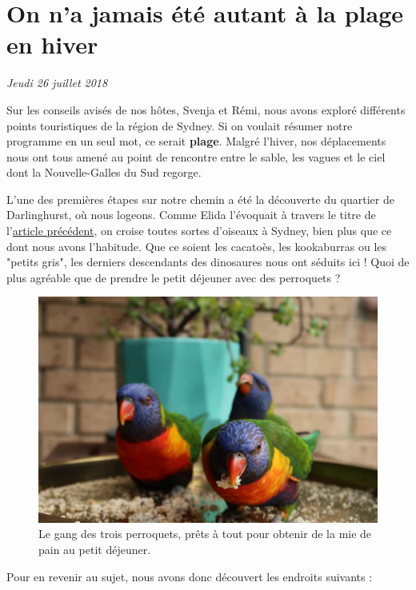 \hypertarget{on-na-jamais-uxe9tuxe9-autant-uxe0-la-plage-en-hiver}{%
\section{On n'a jamais été autant à la plage en
hiver}\label{on-na-jamais-uxe9tuxe9-autant-uxe0-la-plage-en-hiver}}

\emph{Jeudi 26 juillet 2018}

Sur les conseils avisés de nos hôtes, Svenja et Rémi, nous avons exploré
différents points touristiques de la région de Sydney. Si on voulait
résumer notre programme en un seul mot, ce serait \textbf{plage}. Malgré
l'hiver, nos déplacements nous ont tous amené au point de rencontre
entre le sable, les vagues et le ciel dont la Nouvelle-Galles du Sud
regorge.

L'une des premières étapes sur notre chemin a été la découverte du
quartier de Darlinghurst, où nous logeons. Comme Elida l'évoquait à
travers le titre de l'\href{/arrivee-australie.html}{article précédent},
on croise toutes sortes d'oiseaux à Sydney, bien plus que ce dont nous
avons l'habitude. Que ce soient les cacatoès, les kookaburras ou les
"petits gris", les derniers descendants des dinosaures nous ont séduits
ici ! Quoi de plus agréable que de prendre le petit déjeuner avec des
perroquets ?

\begin{figure}
\centering
\includegraphics{images/20180726_perroquets.JPG}
\caption{Le gang des trois perroquets, prêts à tout pour obtenir de la
mie de pain au petit déjeuner.}
\end{figure}

Pour en revenir au sujet, nous avons donc découvert les endroits
suivants :

